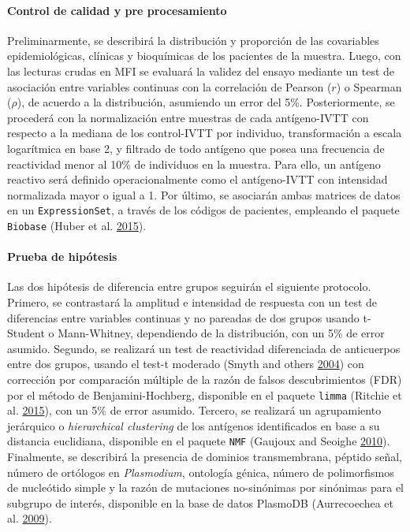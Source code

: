 \documentclass[
  a4paper]{article}
\let\oldparagraph\paragraph
\renewcommand{\paragraph}[1]{\oldparagraph{#1}\mbox{}}
\begin{document}
\hypertarget{control-de-calidad-y-pre-procesamiento}{%
\paragraph{Control de calidad y pre
procesamiento}\label{control-de-calidad-y-pre-procesamiento}}

Preliminarmente, se describirá la distribución y proporción de las
covariables epidemiológicas, clínicas y bioquímicas de los pacientes de
la muestra. Luego, con las lecturas crudas en MFI se evaluará la validez
del ensayo mediante un test de asociación entre variables continuas con
la correlación de Pearson (\(r\)) o Spearman (\(\rho\)), de acuerdo a la
distribución, asumiendo un error del 5\%. Posteriormente, se procederá
con la normalización entre muestras de cada antígeno-IVTT con respecto a
la mediana de los control-IVTT por individuo, transformación a escala
logarítmica en base 2, y filtrado de todo antígeno que posea una
frecuencia de reactividad menor al 10\% de individuos en la muestra.
Para ello, un antígeno reactivo será definido operacionalmente como el
antígeno-IVTT con intensidad normalizada mayor o igual a 1. Por último,
se asociarán ambas matrices de datos en un \texttt{ExpressionSet}, a
través de los códigos de pacientes, empleando el paquete
\texttt{Biobase} (Huber et al. \protect\hyperlink{ref-Biobase}{2015}).

\hypertarget{prueba-de-hipuxf3tesis}{%
\paragraph{Prueba de hipótesis}\label{prueba-de-hipuxf3tesis}}

Las dos hipótesis de diferencia entre grupos seguirán el siguiente
protocolo. Primero, se contrastará la amplitud e intensidad de respuesta
con un test de diferencias entre variables continuas y no pareadas de
dos grupos usando t-Student o Mann-Whitney, dependiendo de la
distribución, con un 5\% de error asumido. Segundo, se realizará un test
de reactividad diferenciada de anticuerpos entre dos grupos, usando el
test-t moderado (Smyth and others
\protect\hyperlink{ref-smyth2004ebayes}{2004}) con corrección por
comparación múltiple de la razón de falsos descubrimientos (FDR) por el
método de Benjamini-Hochberg, disponible en el paquete \texttt{limma}
(Ritchie et al. \protect\hyperlink{ref-limma}{2015}), con un 5\% de
error asumido. Tercero, se realizará un agrupamiento jerárquico o
\emph{hierarchical clustering} de los antígenos identificados en base a
su distancia euclidiana, disponible en el paquete \texttt{NMF} (Gaujoux
and Seoighe \protect\hyperlink{ref-Gaujoux2010NMF}{2010}). Finalmente,
se describirá la presencia de dominios transmembrana, péptido señal,
número de ortólogos en \emph{Plasmodium}, ontología génica, número de
polimorfismos de nucleótido simple y la razón de mutaciones no-sinónimas
por sinónimas para el subgrupo de interés, disponible en la base de
datos PlasmoDB (Aurrecoechea et al.
\protect\hyperlink{ref-plasmodb}{2009}).
\end{document}
